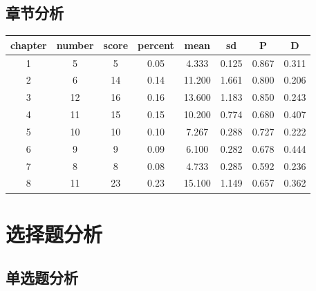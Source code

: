 \documentclass[hyperref,adobefonts]{ctexart}
\begin{document}
\subsection{章节分析}

\begin{longtable}{c|c|c|c|c|c|c|c}
\hline
chapter & number & score & percent & mean & sd & P & D\\
\hline
1 & 5 & 5 & 0.05 & 4.333 & 0.125 & 0.867 & 0.311\\
\hline
2 & 6 & 14 & 0.14 & 11.200 & 1.661 & 0.800 & 0.206\\
\hline
3 & 12 & 16 & 0.16 & 13.600 & 1.183 & 0.850 & 0.243\\
\hline
4 & 11 & 15 & 0.15 & 10.200 & 0.774 & 0.680 & 0.407\\
\hline
5 & 10 & 10 & 0.10 & 7.267 & 0.288 & 0.727 & 0.222\\
\hline
6 & 9 & 9 & 0.09 & 6.100 & 0.282 & 0.678 & 0.444\\
\hline
7 & 8 & 8 & 0.08 & 4.733 & 0.285 & 0.592 & 0.236\\
\hline
8 & 11 & 23 & 0.23 & 15.100 & 1.149 & 0.657 & 0.362\\
\hline
\end{longtable}

\section{选择题分析}

\subsection{单选题分析}
\end{document}
